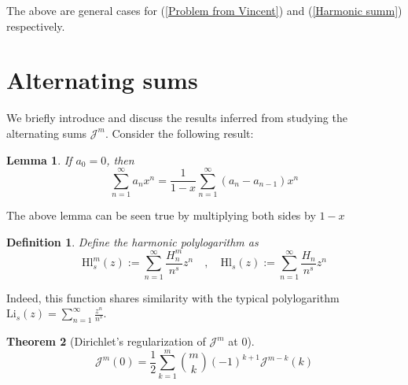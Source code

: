 \documentclass{article}
\newcommand{\powerharmonicetafunction}[2]{{\mathcal{J}}^{#1}(#2)}
\newcommand{\powerhl}[3]{\mathrm{Hl}_{#1}^{#2}(#3)}
\newcommand{\harmonicpolylogarithm}[2]{\mathrm{Hl}_{#1}\left(#2\right)}
\newtheorem{theorem}{Theorem}
\newtheorem{lemma}[theorem]{Lemma}%
\newtheorem{definition}{Definition}%
\begin{document}
The above are general cases for (\ref{Problem from Vincent}) and (\ref{Harmonic summ}) respectively. 

\section{Alternating sums}
We briefly introduce and discuss the results inferred from studying the alternating sums $\mathcal{J}^m$. Consider the following result:
\begin{lemma}\label{coefficient to difference coefficient} If $a_0=0$, then
    \begin{equation} 
        \sum_{n=1}^{\infty} a_n x^n =\frac{1}{1-x}\sum_{n=1}^{\infty} (a_n-a_{n-1})x^n
    \end{equation}
\end{lemma}
The above lemma can be seen true by multiplying both sides by $1-x$
\begin{definition}\label{harmonic polylogarithm} Define the harmonic polylogarithm as
    \begin{equation}
        \powerhl{s}{m}{z}:=\sum_{n=1}^{\infty} \frac{H_n^m}{n^s}z^n 
 \quad ,\quad 
        \harmonicpolylogarithm{s}{z}:=\sum_{n=1}^{\infty} \frac{H_n}{n^s}z^n
    \end{equation}
\end{definition}
Indeed, this function shares similarity with the typical polylogarithm $\mathrm{Li}_s(z)=\sum_{n=1}^{\infty}\frac{z^n}{n^s}$.
\begin{theorem}[Dirichlet's regularization of $\mathcal{J}^m$ at $0$]
    \begin{equation}\label{value of powerharmoniceta at 0}
        \powerharmonicetafunction{m}{0}=\frac{1}{2}\sum_{k=1}^{m} \binom{m}{k} (-1)^{k+1}\powerharmonicetafunction{m-k}{k}
    \end{equation} 
    \end{theorem}
\end{document}
